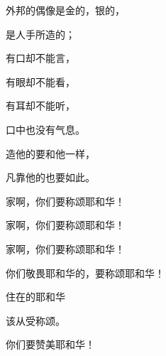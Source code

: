 {\par }{\BB \par }{\Q {}外邦的偶像是金的，银的，
\par }{\Q 是人手所造的；
\par }{\Q {}有口却不能言，
\par }{\Q 有眼却不能看，
\par }{\Q {}有耳却不能听，
\par }{\Q 口中也没有气息。
\par }{\Q {}造他的要和他一样，
\par }{\Q 凡靠他的也要如此。
\par }{\BB \par }{\Q {}家啊，你们要称颂耶和华！
\par }{家啊，你们要称颂耶和华！
\par }{\Q {}家啊，你们要称颂耶和华！
\par }{\Q 你们敬畏耶和华的，要称颂耶和华！
\par }{\Q {}住在{}的耶和华
\par }{\Q 该从{}受称颂。
\par }{\BB \par }{\Q 你们要赞美耶和华！

}
